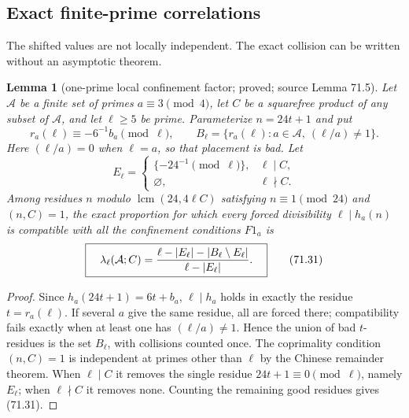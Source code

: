 \documentclass[10pt,reqno]{amsart}
\newtheorem{lemma}[theorem]{Lemma}
\theoremstyle{definition}
\newcommand{\1}{\mathbf 1}
\begin{document}
\subsection{Exact finite-prime correlations}

The shifted values are not locally independent.  The exact collision can be
written without an asymptotic theorem.

\begin{lemma}[one-prime local confinement factor; proved; source Lemma 71.5]\label{lem:local-confinement-factor}  Let
$\mathcal A$ be a finite set of primes $a\equiv3\pmod4$, let $C$ be a
squarefree product of any subset of $\mathcal A$, and let $\ell\geq5$ be
prime.  Parameterize $n=24t+1$ and put
\begin{equation}
 r_a(\ell)\equiv-6^{-1}b_a\pmod\ell,\qquad
 B_\ell=\{r_a(\ell):a\in\mathcal A,\ (\ell/a)\ne1\}.    \tag{71.29}
\end{equation}
Here $(\ell/a)=0$ when $\ell=a$, so that placement is bad.
Let
\begin{equation}
 E_\ell=\begin{cases}\{-24^{-1}\pmod\ell\},&\ell\mid C,\\
                       \varnothing,&\ell\nmid C.
       \end{cases}                                        \tag{71.30}
\end{equation}
Among residues $n$ modulo
$\operatorname {lcm}(24,4\ell C)$ satisfying
$n\equiv1\pmod {24}$ and $(n,C)=1$, the exact proportion for
which every forced divisibility $\ell\mid h_a(n)$ is compatible with
all the confinement conditions $F1_a$ is
\begin{equation}
 \boxed{\quad
 \lambda_\ell(\mathcal A;C)
 ={\ell-|E_\ell|-|B_\ell\setminus E_\ell|
   \over\ell-|E_\ell|}.\quad}                             \tag{71.31}
\end{equation}

\end{lemma}
\begin{proof} Since $h_a(24t+1)=6t+b_a$,
$\ell\mid h_a$ holds in exactly the residue $t=r_a(\ell)$.  If
several $a$ give the same residue, all are forced there; compatibility
fails exactly when at least one has $(\ell/a)\ne1$.  Hence the union of
bad $t$-residues is the set $B_\ell$, with collisions counted once.
The coprimality condition $(n,C)=1$ is independent at primes other than
$\ell$ by the Chinese remainder theorem.  When $\ell\mid C$ it removes
the single residue $24t+1\equiv0\pmod\ell$, namely $E_\ell$; when
$\ell\nmid C$ it removes none.  Counting the remaining good residues
gives (71.31).
\end{proof}
\end{document}
